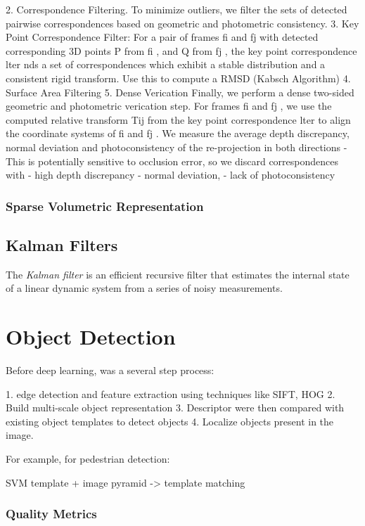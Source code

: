 2. Correspondence Filtering. To minimize outliers, we filter the sets of detected pairwise correspondences based on geometric and photometric consistency.
3. Key Point Correspondence Filter: For a pair of frames fi and fj with detected corresponding 3D points P from fi , and Q from fj , the key point correspondence lter nds a set of correspondences which exhibit a stable distribution and a consistent rigid transform. Use this to compute a RMSD (Kabsch Algorithm)
4. Surface Area Filtering
5. Dense Verication Finally, we perform a dense two-sided geometric and photometric verication step. For frames fi and fj , we use the computed relative transform Tij from the key point correspondence lter to align the coordinate systems of fi and fj . We measure the average depth discrepancy, normal deviation and photoconsistency of the re-projection in both directions
   - This is potentially sensitive to occlusion error, so we discard correspondences with 
   - high depth discrepancy
   - normal deviation,
   - lack of photoconsistency

\subsubsection{Sparse Volumetric Representation}



\subsection{Kalman Filters}

The \emph{Kalman filter} is an efficient recursive filter that estimates the internal state of a linear dynamic system from a series of noisy measurements.

\section{Object Detection}

Before deep learning, was a several step process: 

1. edge detection and feature extraction using techniques like SIFT, HOG 
2. Build multi-scale object representation
3. Descriptor were then compared with existing object templates to detect objects
4. Localize objects present in the image.

For example, for pedestrian detection:

SVM template + image pyramid -> template matching

\subsubsection{Quality Metrics}

